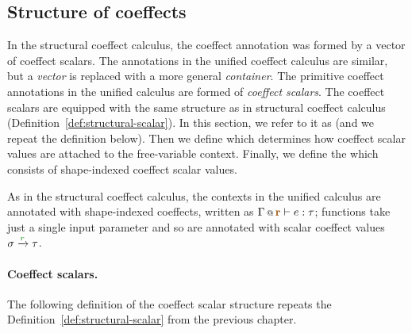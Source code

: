 \subsection{Structure of coeffects}
In the structural coeffect calculus, the coeffect annotation was formed by a vector of coeffect
scalars. The annotations in the unified coeffect calculus are similar, but a \emph{vector} is 
replaced with a more general \emph{container}. The primitive coeffect annotations in the unified 
calculus are formed of \emph{coeffect scalars}. The coeffect scalars are equipped with the same
structure as in structural coeffect calculus (Definition~\ref{def:structural-scalar}). In this 
section, we refer to it as \emph{} (and we repeat the definition 
below). Then we define \emph{} which determines how coeffect 
scalar values are attached to the free-variable context. Finally, we define the 
\emph{} which consists of shape-indexed coeffect scalar values.

As in the structural coeffect calculus, the contexts in the unified calculus are annotated with 
shape-indexed coeffects, written as $\coctx{\Gamma}{\aclrd{\textbf{r}}} \vdash e : \tau$; 
functions take just a single input parameter and so are annotated with scalar coeffect values 
$\sigma \xrightarrow{\cclrd{r}} \tau$.

\paragraph{Coeffect scalars.}
The following definition of the coeffect scalar structure repeats the 
Definition~\ref{def:structural-scalar} from the previous chapter.

